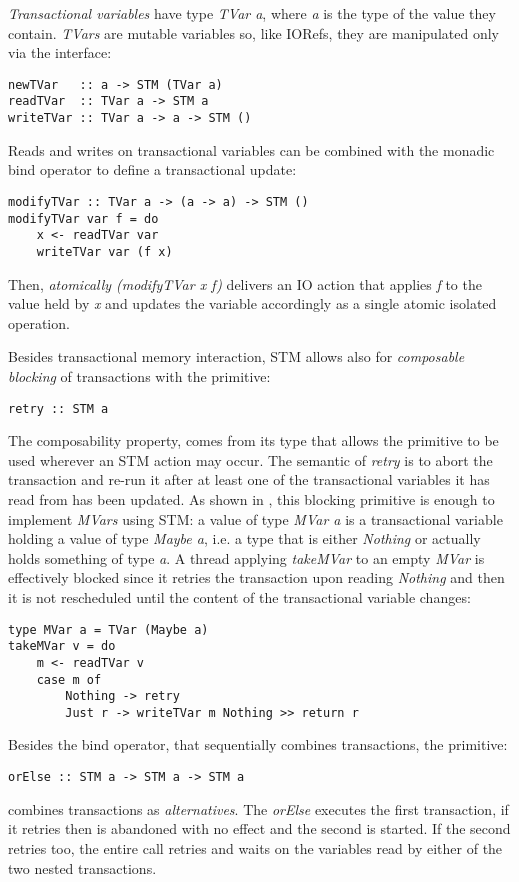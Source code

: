 \emph{Transactional variables} have type \emph{TVar a}, where \emph{a} is the type of the value they contain. \emph{TVars} are mutable variables so, like IORefs, they are manipulated only via the interface:
\begin{lstlisting}
newTVar   :: a -> STM (TVar a)
readTVar  :: TVar a -> STM a
writeTVar :: TVar a -> a -> STM ()
\end{lstlisting}

Reads and writes on transactional variables can be combined with the monadic bind operator to define a transactional update:

\begin{lstlisting}
modifyTVar :: TVar a -> (a -> a) -> STM ()
modifyTVar var f = do
    x <- readTVar var
    writeTVar var (f x)
\end{lstlisting}

Then, \emph{atomically (modifyTVar x f)} delivers an IO action that applies \emph{f} to the value held by \emph{x} and updates the variable accordingly as a single atomic isolated operation.

Besides transactional memory interaction, STM allows also for \emph{composable blocking} of transactions with the primitive:

\begin{lstlisting}
retry :: STM a
\end{lstlisting}

The composability property, comes from its type that allows the primitive to be used wherever an STM action may occur.
The semantic of \emph{retry} is to abort the transaction and re-run it after at least one of the transactional variables it has read from has been updated.
As shown in \cite{Harris:2005:CMT:1065944.1065952}, this blocking primitive is enough to implement \emph{MVars} using STM: a value of type \emph{MVar a} is a transactional variable holding a value of type \emph{Maybe a}, i.e. a type that is either \emph{Nothing} or actually holds something of type \emph{a}. A thread applying \emph{takeMVar} to an empty \emph{MVar} is effectively blocked since it retries the transaction upon reading \emph{Nothing} and then it is not rescheduled until the content of the transactional variable changes:

\begin{lstlisting}
type MVar a = TVar (Maybe a)
takeMVar v = do
    m <- readTVar v
    case m of
        Nothing -> retry
        Just r -> writeTVar m Nothing >> return r
\end{lstlisting}

Besides the bind operator, that sequentially combines transactions, the primitive:
\begin{lstlisting}
orElse :: STM a -> STM a -> STM a
\end{lstlisting}
combines transactions as \emph{alternatives}. The \emph{orElse} executes the first transaction, if it retries then is abandoned with no effect and the second is started. If the second retries too, the entire call retries and waits on the variables read by either of the two nested transactions.  

